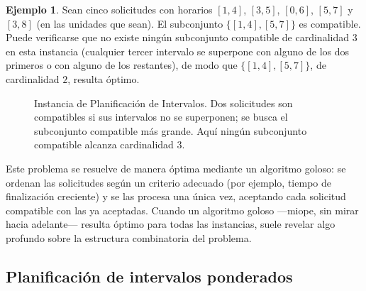 \documentclass[12pt, spanish, oneside, openany]{book}
\theoremstyle{uprightplain}
\theoremstyle{definition}
\newtheorem{ejemplo}[teorema]{Ejemplo}
\theoremstyle{remark}
\theoremstyle{definition}
\begin{document}
\begin{ejemplo}
Sean cinco solicitudes con horarios $[1,4]$, $[3,5]$, $[0,6]$, $[5,7]$ y $[3,8]$ (en las unidades que sean). El subconjunto $\{[1,4],[5,7]\}$ es compatible. Puede verificarse que no existe ningún subconjunto compatible de cardinalidad $3$ en esta instancia (cualquier tercer intervalo se superpone con alguno de los dos primeros o con alguno de los restantes), de modo que $\{[1,4],[5,7]\}$, de cardinalidad $2$, resulta óptimo.
\end{ejemplo}
\begin{figure}[H]
\centering
{}
\caption{Instancia de Planificación de Intervalos. Dos solicitudes son
compatibles si sus intervalos no se superponen; se busca el subconjunto
compatible más grande. Aquí ningún subconjunto compatible alcanza
cardinalidad $3$.}
\label{fig:intervalos}
\end{figure}

Este problema se resuelve de manera óptima mediante un algoritmo goloso: se ordenan las solicitudes según un criterio adecuado (por ejemplo, tiempo de finalización creciente) y se las procesa una única vez, aceptando cada solicitud compatible con las ya aceptadas. Cuando un algoritmo goloso —miope, sin mirar hacia adelante— resulta óptimo para todas las instancias, suele revelar algo profundo sobre la estructura combinatoria del problema.

\subsection{Planificación de intervalos ponderados}
\label{subsec:interval-pesado}
\end{document}
